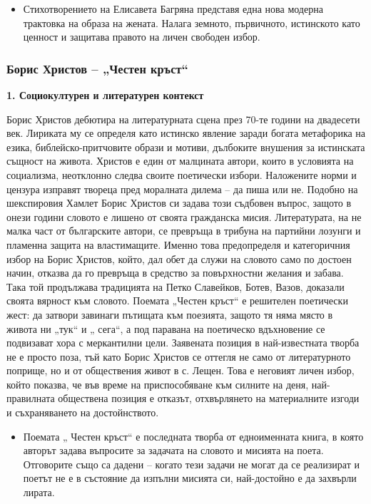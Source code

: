\documentclass[12pt,a4paper]{article}
\begin{document}
\begin{itemize}[leftmargin=*]
\vspace{-0.75cm}
\item Стихотворението на Елисавета Багряна представя една нова модерна трактовка на образа на жената.
Налага земното, първичното, истинското като ценност и защитава правото на личен свободен избор.
\end{itemize}
\newpage

\subsubsection{\colorbox{green!40}{Борис Христов – „Честен кръст“}}

\textbf{1. Социокултурен и литературен контекст}
\vspace{0.1cm}
 
\indent Борис Христов  дебютира на литературната сцена през 70-те години на двадесети век. Лириката му се определя  като истинско явление заради богата метафорика на езика, библейско-притчовите образи и мотиви, дълбоките внушения за истинската същност на живота.  Христов е един от малцината автори, които в условията на социализма, неотклонно следва своите поетически избори. Наложените норми и цензура изправят твореца пред моралната дилема – да пиша или не. Подобно на шекспировия Хамлет Борис Христов си задава този съдбовен въпрос, защото в онези години словото е лишено от своята гражданска мисия. Литературата, на не малка част от българските автори, се превръща в трибуна на партийни лозунги и пламенна защита на властимащите. Именно това предопределя и категоричния избор на Борис Христов, който, дал обет да служи на словото само по достоен начин, отказва да го превръща в средство за повърхностни желания и забава.  Така той продължава традицията на Петко Славейков, Ботев, Вазов, доказали своята вярност към словото. Поемата „Честен кръст“  е решителен поетически жест: да затвори завинаги пътищата към поезията, защото  тя няма място в живота ни „тук“ и „ сега“, а под паравана на поетическо вдъхновение се подвизават хора с меркантилни цели. Заявената позиция в най-известната творба не е просто поза, тъй като Борис Христов се оттегля не само от литературното поприще, но и от обществения живот в с. Лещен. Това е неговият личен избор, който показва, че във време на приспособяване към силните на деня, най-правилната обществена позиция е отказът, отхвърлянето на материалните изгоди и съхраняването на достойнството. 

\begin{itemize}[leftmargin=*]
\vspace{-0.2cm}
\item Поемата „ Честен кръст“ е последната творба от едноименната книга, в която авторът задава въпросите за задачата на словото и мисията на поета. Отговорите също са дадени – когато тези задачи не могат да се реализират и поетът не е в състояние да изпълни мисията си, най-достойно е да захвърли лирата.
\end{itemize}
\end{document}
